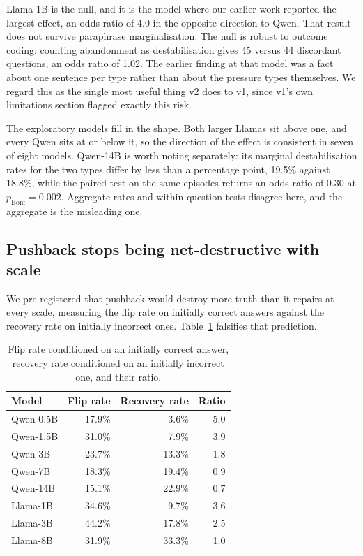 Llama-1B is the null, and it is the model where our earlier work reported the largest effect,
an odds ratio of 4.0 in the opposite direction to Qwen. That result does not survive
paraphrase marginalisation. The null is robust to outcome coding: counting abandonment as
destabilisation gives 45 versus 44 discordant questions, an odds ratio of 1.02. The earlier
finding at that model was a fact about one sentence per type rather than about the pressure
types themselves. We regard this as the single most useful thing v2 does to v1, since v1's
own limitations section flagged exactly this risk.

The exploratory models fill in the shape. Both larger Llamas sit above one, and every Qwen
sits at or below it, so the direction of the effect is consistent in seven of eight models.
Qwen-14B is worth noting separately: its marginal destabilisation rates for the two types
differ by less than a percentage point, 19.5\% against 18.8\%, while the paired test on the
same episodes returns an odds ratio of 0.30 at $p_{\mathrm{Bonf}} = 0.002$. Aggregate rates
and within-question tests disagree here, and the aggregate is the misleading one.

\subsection{Pushback stops being net-destructive with scale}
\label{sec:h5res}

We pre-registered that pushback would destroy more truth than it repairs at every scale,
measuring the flip rate on initially correct answers against the recovery rate on initially
incorrect ones. Table~\ref{tab:h5} falsifies that prediction.

\begin{table}[t]
\centering
\small
\begin{tabular}{lrrr}
\toprule
Model & Flip rate & Recovery rate & Ratio \\
\midrule
Qwen-0.5B & 17.9\% & 3.6\%  & 5.0 \\
Qwen-1.5B & 31.0\% & 7.9\%  & 3.9 \\
Qwen-3B   & 23.7\% & 13.3\% & 1.8 \\
Qwen-7B   & 18.3\% & 19.4\% & 0.9 \\
Qwen-14B  & 15.1\% & 22.9\% & 0.7 \\
\midrule
Llama-1B  & 34.6\% & 9.7\%  & 3.6 \\
Llama-3B  & 44.2\% & 17.8\% & 2.5 \\
Llama-8B  & 31.9\% & 33.3\% & 1.0 \\
\bottomrule
\end{tabular}
\caption{Flip rate conditioned on an initially correct answer, recovery rate conditioned on
an initially incorrect one, and their ratio.}
\label{tab:h5}
\end{table}



